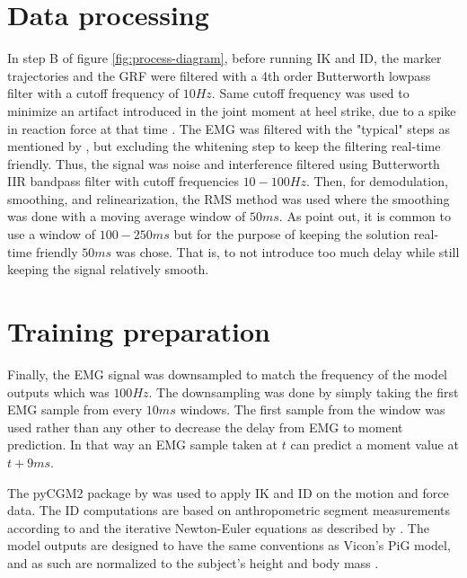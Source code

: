\documentclass[../main.tex]{subfiles}
\begin{document}
\section{Data processing}
In step B of figure \ref{fig:process-diagram}, before running \ac{IK} and \ac{ID}, the marker trajectories and the \ac{GRF} were filtered with a 4th order Butterworth lowpass filter with a cutoff frequency of $10Hz$. 
Same cutoff frequency was used to minimize an artifact introduced in the joint moment at heel strike, due to a spike in reaction force at that time \cite{Kristianslund2012}.
The \ac{EMG} was filtered with the "typical" steps as mentioned by \textcite[99]{Clancy2016}, but excluding the whitening step to keep the filtering real-time friendly.
Thus, the signal was noise and interference filtered using Butterworth IIR bandpass filter with cutoff frequencies $10-100Hz$. 
Then, for demodulation, smoothing, and relinearization, the RMS method was used where the smoothing was done with a moving average window of $50ms$. 
As \textcite{Clancy2016} point out, it is common to use a window of $100-250 ms$ but for the purpose of keeping the solution real-time friendly $50ms$ was chose.
That is, to not introduce too much delay while still keeping the signal relatively smooth.

\section{Training preparation}
Finally, the \ac{EMG} signal was downsampled to match the frequency of the model outputs which was $100Hz$. 
The downsampling was done by simply taking the first \ac{EMG} sample from every $10ms$ windows. 
The first sample from the window was used rather than any other to decrease the delay from \ac{EMG} to moment prediction. 
In that way an \ac{EMG} sample taken at $t$ can predict a moment value at $t+9ms$. 

The pyCGM2 package by \textcite{Leboeuf2019} was used to apply \ac{IK} and \ac{ID} on the motion and force data.
The \ac{ID} computations are based on anthropometric segment measurements according to \textcite{Dempster1955} and the iterative Newton-Euler equations as described by \textcite{Dumas2004}.
The model outputs are designed to have the same conventions as Vicon's \ac{PiG} model, and as such are normalized to the subject's height and body mass \cite{Leboeuf2019, viconpig}.
\end{document}
